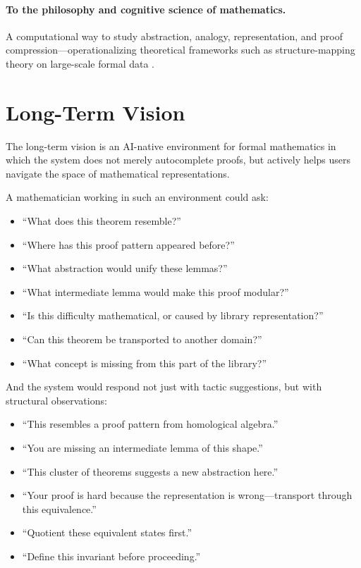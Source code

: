 \documentclass[12pt, a4paper]{article}
\begin{document}
\paragraph{To the philosophy and cognitive science of mathematics.}
A computational way to study abstraction, analogy, representation, and proof
compression---operationalizing theoretical frameworks such as structure-mapping
theory \citep{gentner1983} on large-scale formal data \citep{mitchell2021,
zhang2023cognitive}.

\section{Long-Term Vision}

The long-term vision is an AI-native environment for formal mathematics in
which the system does not merely autocomplete proofs, but actively helps
users navigate the space of mathematical representations.

A mathematician working in such an environment could ask:
\begin{itemize}[leftmargin=1.5em]
  \item ``What does this theorem resemble?''
  \item ``Where has this proof pattern appeared before?''
  \item ``What abstraction would unify these lemmas?''
  \item ``What intermediate lemma would make this proof modular?''
  \item ``Is this difficulty mathematical, or caused by library representation?''
  \item ``Can this theorem be transported to another domain?''
  \item ``What concept is missing from this part of the library?''
\end{itemize}

And the system would respond not just with tactic suggestions, but with
structural observations:
\begin{itemize}[leftmargin=1.5em]
  \item ``This resembles a proof pattern from homological algebra.''
  \item ``You are missing an intermediate lemma of this shape.''
  \item ``This cluster of theorems suggests a new abstraction here.''
  \item ``Your proof is hard because the representation is wrong---transport
        through this equivalence.''
  \item ``Quotient these equivalent states first.''
  \item ``Define this invariant before proceeding.''
\end{itemize}
\end{document}
